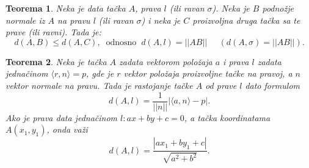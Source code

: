 \documentclass[a4paper,12pt,twoside]{report}
\newtheorem{theorem}{Teorema}[section]
\numberwithin{algorithm}{section}
\begin{document}
\begin{theorem}
    Neka je data tačka $A$, prava $l$ (ili ravan $\sigma$). Neka je $B$ podnožje normale iz $A$ na pravu $l$ (ili ravan $\sigma$) i 
    neka je $C$ proizvoljna druga tačka sa te prave (ili ravni). Tada je:
    \[ d(A, B) \leq d(A, C), \;\; \text{odnosno} \;\; d(A, l) = ||AB||\;\;\;\;\;(d(A, \sigma) = ||AB||) .\]
\end{theorem}
\begin{figure}[!h]
\centering
{}
\end{figure}

\begin{theorem}
    Neka je tačka $A$ zadata vektorom položaja $a$ i prava $l$ zadata jednačinom $\langle r, n \rangle = p$, gde je $r$ vektor
    položaja proizvoljne tačke na pravoj, a $n$ vektor normale na pravu. Tada je rastojanje 
    tačke $A$ od prave $l$ dato formulom
    \[ d(A, l) = \frac{1}{||n||}\left|\langle a, n\rangle - p\right|. \]
    Ako je prava data jednačinom $l: ax + by + c = 0$, a tačka koordinatama $A(x_1, y_1)$, onda važi
    \[ d(A, l) = \frac{|ax_1 + by_1 + c|}{\sqrt{a^2 + b^2}}. \]
\end{theorem}
\end{document}
